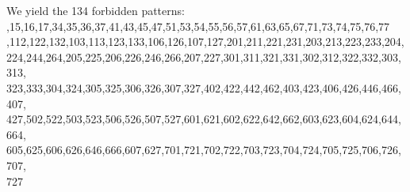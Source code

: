 \documentclass[12pt]{report}
\begin{document}
{{\begin{figure}[ht]
\begin{subfigure}[b]{0.1\textwidth}
\end{subfigure}\begin{subfigure}[b]{0.1\textwidth}
        	\centering


\end{subfigure}\begin{subfigure}[b]{0.1\textwidth}
        	\centering


\end{subfigure}
         
\end{figure}

\noindent We yield the 134 forbidden patterns: \\

,15,16,17,34,35,36,37,41,43,45,47,51,53,54,55,56,57,61,63,65,67,71,73,74,75,76,77 \\

,112,122,132,103,113,123,133,106,126,107,127,201,211,221,231,203,213,223,233,204,\\
224,244,264,205,225,206,226,246,266,207,227,301,311,321,331,302,312,322,332,303,313,\\
323,333,304,324,305,325,306,326,307,327,402,422,442,462,403,423,406,426,446,466,407,\\
427,502,522,503,523,506,526,507,527,601,621,602,622,642,662,603,623,604,624,644,664,\\
605,625,606,626,646,666,607,627,701,721,702,722,703,723,704,724,705,725,706,726,707,\\
727 \\

}}
\end{document}
